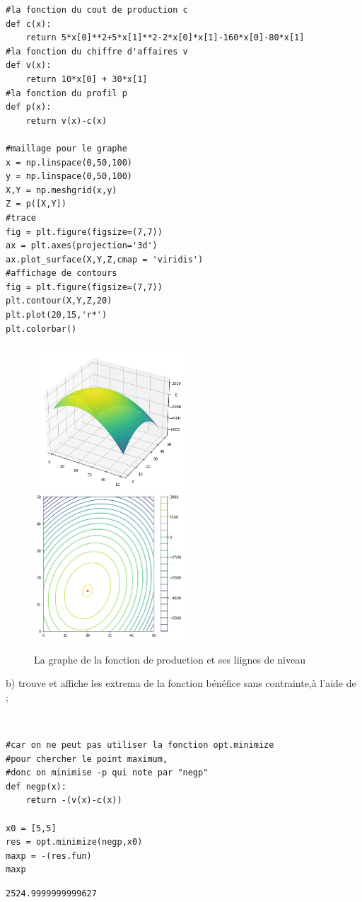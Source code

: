 \documentclass[12pt]{report}
\begin{document}
\begin{lstlisting}
#la fonction du cout de production c
def c(x):
    return 5*x[0]**2+5*x[1]**2-2*x[0]*x[1]-160*x[0]-80*x[1]
#la fonction du chiffre d'affaires v
def v(x):
    return 10*x[0] + 30*x[1]
#la fonction du profil p
def p(x):
    return v(x)-c(x)
    
#maillage pour le graphe
x = np.linspace(0,50,100)
y = np.linspace(0,50,100)
X,Y = np.meshgrid(x,y)
Z = p([X,Y])
#trace
fig = plt.figure(figsize=(7,7))
ax = plt.axes(projection='3d')
ax.plot_surface(X,Y,Z,cmap = 'viridis')
#affichage de contours
fig = plt.figure(figsize=(7,7))
plt.contour(X,Y,Z,20)
plt.plot(20,15,'r*')
plt.colorbar()
\end{lstlisting}

\begin{figure}[h!]
    \caption{La graphe de la fonction de production et ses liignes de niveau}
    \includegraphics[width=0.5\textwidth]{images/1.png}
    \includegraphics[width=0.5\textwidth]{images/2.png}
    \label{}
\end{figure}

\begin{flushleft}
b) trouve et affiche les extrema de la fonction bénéfice sans contrainte,à l’aide de \color{gray}{"opt.minimize"}; \end{flushleft}\\
\begin{lstlisting}
#car on ne peut pas utiliser la fonction opt.minimize 
#pour chercher le point maximum,
#donc on minimise -p qui note par "negp"
def negp(x):
    return -(v(x)-c(x))

x0 = [5,5] 
res = opt.minimize(negp,x0)
maxp = -(res.fun)
maxp
\end{lstlisting}
\begin{lstlisting}
2524.9999999999627
\end{lstlisting}
\end{document}
